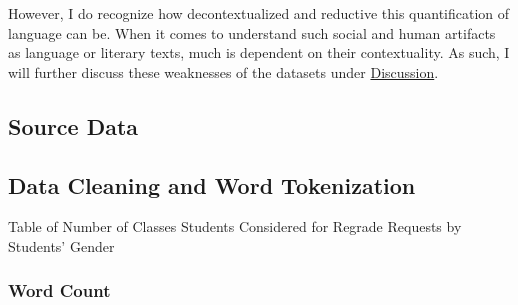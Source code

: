 \documentclass[
  letterpaper,
  DIV=11,
  numbers=noendperiod]{scrartcl}
\begin{document}
However, I do recognize how decontextualized and reductive this
quantification of language can be. When it comes to understand such
social and human artifacts as language or literary texts, much is
dependent on their contextuality. As such, I will further discuss these
weaknesses of the datasets under \hyperref[discussion]{Discussion}.

\subsection{Source Data}\label{source-data}

\subsection{Data Cleaning and Word
Tokenization}\label{data-cleaning-and-word-tokenization}

\begin{table}

\caption{\label{tbl-genderclass}Table of Number of Classes Students
Considered for Regrade Requests by Students' Gender}

\centering{

}

\end{table}%

\subsubsection{Word Count}\label{word-count}
\end{document}
